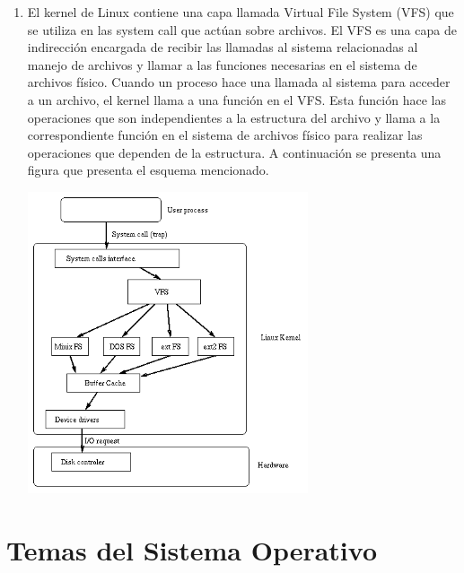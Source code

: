 \documentclass[a4paper,11pt] {article}
\begin{document}
\begin{enumerate}
\begin{enumerate}
				\item El kernel de Linux contiene una capa llamada Virtual File System (VFS) que se utiliza en las system call que actúan sobre archivos. El VFS es una capa de indirección encargada de recibir las llamadas al sistema relacionadas al manejo de archivos y llamar a las funciones necesarias en el sistema de archivos físico. 
				Cuando un proceso hace una llamada al sistema para acceder a un archivo, el kernel llama a una función en el VFS. Esta función hace las operaciones que son independientes a la estructura del archivo y llama a la correspondiente función en el sistema de archivos físico para realizar las operaciones que dependen de la estructura. A continuación se presenta una figura que presenta el esquema mencionado.
				\begin{center}
				\includegraphics[width=0.65\textwidth]{ext2-vfs.png}
				\end{center}

			\end{enumerate}


		

		
	\end{enumerate}

\section*{Temas del Sistema Operativo}
\end{document}
